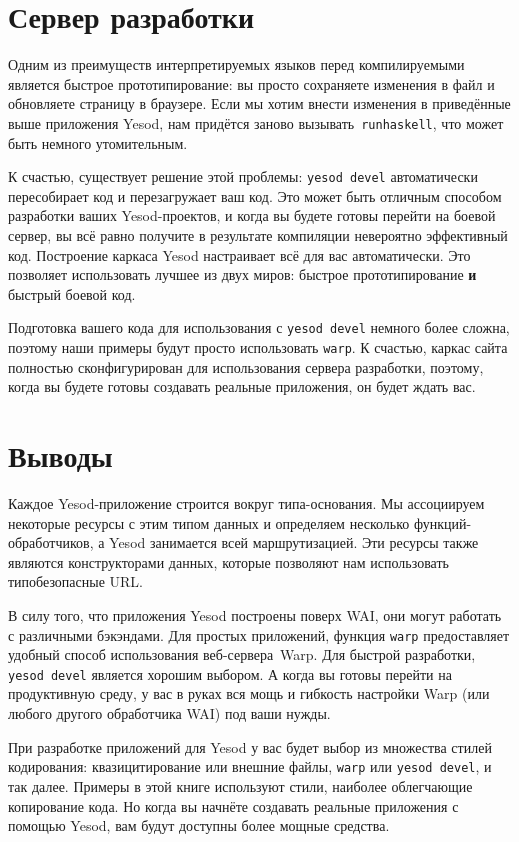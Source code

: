 \section{Сервер разработки}

Одним из преимуществ интерпретируемых языков перед компилируемыми является
быстрое прототипирование: вы просто сохраняете изменения в файл и обновляете
страницу в браузере. Если мы хотим внести изменения в приведённые выше
приложения Yesod, нам придётся заново вызывать~\texttt{runhaskell}, что может
быть немного утомительным.

К счастью, существует решение этой проблемы: \texttt{yesod devel} автоматически
пересобирает код и перезагружает ваш код. Это может быть отличным способом
разработки ваших Yesod-проектов, и когда вы будете готовы перейти на боевой
сервер, вы всё равно получите в результате компиляции невероятно эффективный
код. Построение каркаса Yesod настраивает всё для вас автоматически. Это
позволяет использовать лучшее из двух миров: быстрое прототипирование
\textbf{и} быстрый боевой код.

Подготовка вашего кода для использования с \texttt{yesod devel} немного более
сложна, поэтому наши примеры будут просто использовать \lstinline!warp!. К
счастью, каркас сайта полностью сконфигурирован для использования сервера
разработки, поэтому, когда вы будете готовы создавать реальные приложения, он
будет ждать вас.

\section{Выводы}

Каждое Yesod-приложение строится вокруг типа-основания.  Мы ассоциируем
некоторые ресурсы с этим типом данных и определяем несколько
функций-обработчиков, а Yesod занимается всей маршрутизацией. Эти ресурсы также
являются конструкторами данных, которые позволяют нам использовать
типобезопасные URL.

В силу того, что приложения Yesod построены поверх WAI, они могут работать с
различными бэкэндами. Для простых приложений, функция \lstinline{warp}
предоставляет удобный способ использования веб-сервера~Warp. Для быстрой
разработки, \texttt{yesod devel} является хорошим выбором. А когда вы готовы
перейти на продуктивную среду, у вас в руках вся мощь и гибкость настройки Warp
(или любого другого обработчика WAI) под ваши нужды.

При разработке приложений для Yesod у вас будет выбор из множества стилей
кодирования: квазицитирование или внешние файлы, \lstinline{warp} или
\texttt{yesod devel}, и так далее. Примеры в этой книге используют стили,
наиболее облегчающие копирование кода. Но когда вы начнёте создавать реальные
приложения с помощью Yesod, вам будут доступны более мощные средства.
